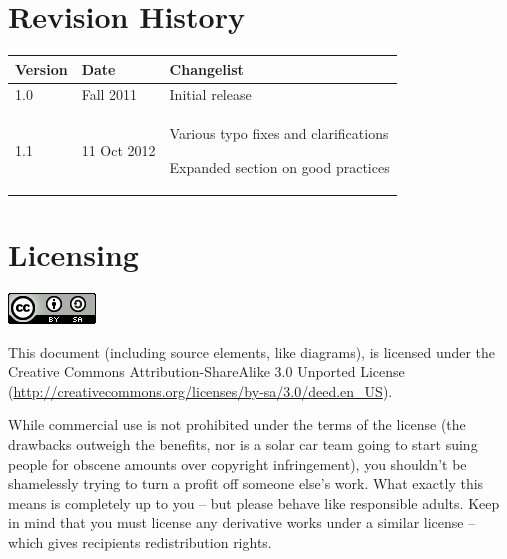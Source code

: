 \documentclass[letterpaper]{article}
\begin{document}
\section{Revision History}
\begin{flushleft}
\tablefirsthead{}
\tablehead{}
\tabletail{}
\tablelasttail{}
\begin{supertabular}{|m{0.9900598in}|m{0.9136598in}|m{5.3670597in}|}
\hline
{\sffamily\bfseries\color[rgb]{0.30980393,0.5058824,0.7411765} Version} &
{\sffamily\bfseries\color[rgb]{0.30980393,0.5058824,0.7411765} Date} &
{\sffamily\bfseries\color[rgb]{0.30980393,0.5058824,0.7411765} Changelist}\\\hline
{\sffamily\color[rgb]{0.30980393,0.5058824,0.7411765} 1.0} &
{\sffamily\color[rgb]{0.30980393,0.5058824,0.7411765} Fall 2011} &
{\sffamily\color[rgb]{0.30980393,0.5058824,0.7411765} Initial release}\\\hline
{\sffamily\color[rgb]{0.30980393,0.5058824,0.7411765} 1.1} &
{\sffamily\color[rgb]{0.30980393,0.5058824,0.7411765} 11 Oct 2012} &
{\sffamily\color[rgb]{0.30980393,0.5058824,0.7411765} Various typo fixes and clarifications}

{\sffamily\color[rgb]{0.30980393,0.5058824,0.7411765} Expanded section on good
practices}\\\hline
\end{supertabular}
\end{flushleft}
\section{Licensing}
 \includegraphics[width=0.9165in,height=0.3228in]{figures/ee4document-img001.png} 

{\sffamily\color[rgb]{0.30980393,0.5058824,0.7411765}
This document (including source elements, like diagrams), is licensed under the Creative Commons Attribution-ShareAlike
3.0 Unported License (\url{http://creativecommons.org/licenses/by-sa/3.0/deed.en_US}).}


\bigskip

{\sffamily\color[rgb]{0.30980393,0.5058824,0.7411765}
While commercial use is not prohibited under the terms of the license (the drawbacks outweigh the benefits, nor is a
solar car team going to start suing people for obscene amounts over copyright infringement), you shouldn't be
shamelessly trying to turn a profit off someone else's work. What exactly this means is completely up to you -- but
please behave like responsible adults. Keep in mind that you must license any derivative works under a similar license
-- which gives recipients redistribution rights.}
\end{document}
